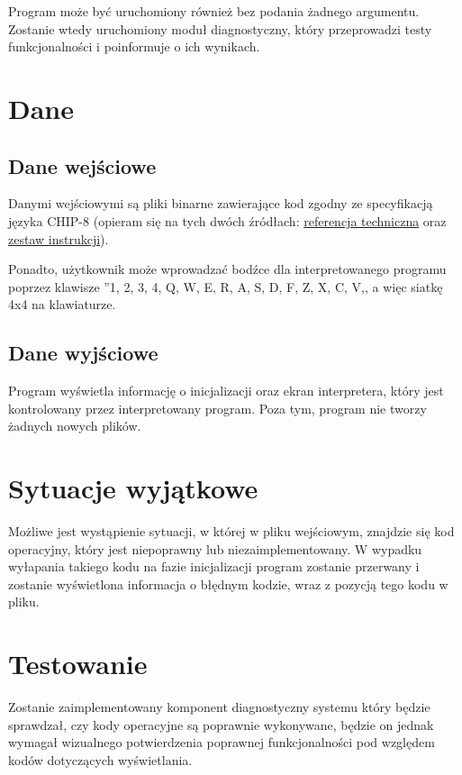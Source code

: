 \documentclass[a4paper,12pt]{report}
\begin{document}
Program może być uruchomiony również bez podania żadnego argumentu. Zostanie wtedy uruchomiony moduł diagnostyczny, który przeprowadzi testy funkcjonalności i poinformuje o ich wynikach.

\chapter{Dane}
\thispagestyle{fancy}

\section{Dane wejściowe}
Danymi wejściowymi są pliki binarne zawierające kod zgodny ze specyfikacją języka CHIP-8 (opieram się na tych dwóch źródłach: \href{https://github.com/mattmikolay/chip-8/wiki/CHIP\%E2\%80\%908-Technical-Reference}{referencja techniczna} oraz \href{https://github.com/mattmikolay/chip-8/wiki/CHIP\%E2\%80\%908-Instruction-Set}{zestaw instrukcji}).

Ponadto, użytkownik może wprowadzać bodźce dla interpretowanego programu poprzez klawisze ''1, 2, 3, 4, Q, W, E, R, A, S, D, F, Z, X, C, V,, a więc siatkę 4x4 na klawiaturze.

\section{Dane wyjściowe}
Program wyświetla informację o inicjalizacji oraz ekran interpretera, który jest kontrolowany przez interpretowany program. Poza tym, program nie tworzy żadnych nowych plików.

\chapter{Sytuacje wyjątkowe}
\thispagestyle{fancy}
Możliwe jest wystąpienie sytuacji, w której w pliku wejściowym, znajdzie się kod operacyjny, który jest niepoprawny lub niezaimplementowany. W wypadku wyłapania takiego kodu na fazie inicjalizacji program zostanie przerwany i zostanie wyświetlona informacja o błędnym kodzie, wraz z pozycją tego kodu w pliku.

\chapter{Testowanie}
\thispagestyle{fancy}
Zostanie zaimplementowany komponent diagnostyczny systemu który będzie sprawdzał, czy kody operacyjne są poprawnie wykonywane, będzie on jednak wymagał wizualnego potwierdzenia poprawnej funkcjonalności pod względem kodów dotyczących wyświetlania.
\end{document}
